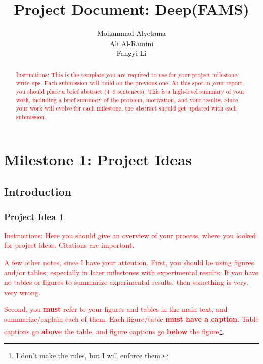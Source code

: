 \documentclass{report}
\title{Project Document: Deep(FAMS)}
\author{Mohammad Alyetama \\
Ali Al-Ramini \\
Fangyi Li }
\date{}
\begin{document}
\maketitle

\tableofcontents

\begin{abstract}
\textcolor{red}{Instructions: This is the template you are required to use for your project milestone write-ups.  Each submission will build on the previous one.  At this spot in your report, you should place a brief abstract (4--6 sentences). This is a high-level summary of your work, including a brief summary of the problem, motivation, and your results.  Since your work will evolve for each milestone, the abstract should get updated with each submission.}
\end{abstract}

\chapter{Milestone 1: Project Ideas}

\section{Introduction}

\subsection{Project Idea 1}
%
\textcolor{red}{Instructions: Here you should give an 
overview of your process, where you looked for project ideas. Citations are important.} %

\textcolor{red}{A few other notes, since I have your attention. First, you should be using figures and/or tables, especially in later milestones with experimental results.  If you have no tables or figures to summarize experimental results, then something is very, very wrong.} %

\textcolor{red}{Second, you {\bf must} refer to your figures and tables in the main text, and summarize/explain each of  them.  Each figure/table {\bf must have a caption}.  Table captions go {\bf above} the table, and figure captions go {\bf below} the figure\footnote{I don't make the rules, but I will enforce them.}.} %
\end{document}
